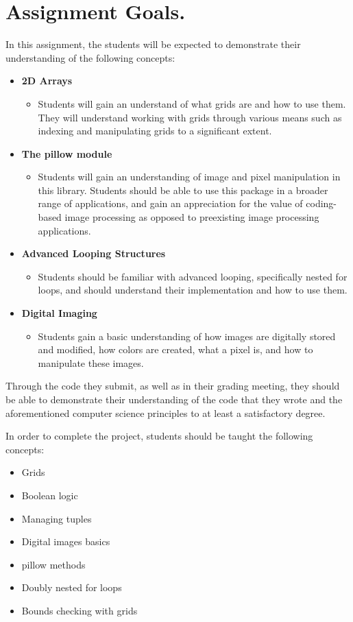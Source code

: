 \documentclass[11pt, letterpaper, onecolumn, oneside, final]{article}
\begin{document}
    \maketitle
\section{Assignment Goals.}
In this assignment, the students will be expected to demonstrate their understanding of the following concepts:
\begin{itemize}
\item \textbf{2D Arrays}
\begin{itemize}
    \item Students will gain an understand of what grids are and how to use them. They will understand working with grids through various means such as indexing and manipulating grids to a significant extent.
\end{itemize}

\item \textbf{The {\consolas pillow} module}
\begin{itemize}
    \item Students will gain an understanding of image and pixel manipulation in this library.
     Students should be able to use this package in a broader range of applications, and gain an appreciation for the value of coding-based image processing as opposed to preexisting image processing applications. 
\end{itemize}
\item \textbf{Advanced Looping Structures} 
\begin{itemize}
    \item Students should be familiar with advanced looping, specifically nested for loops, and should understand their implementation and how to use them.
\end{itemize}
\item \textbf{Digital Imaging}
\begin{itemize}
    \item Students gain a basic understanding of how images are digitally stored and modified, how colors are created, what a pixel is, and how to manipulate these images.
\end{itemize}
\end{itemize}
Through the code they submit, as well as in their grading meeting, they should be able to demonstrate their understanding of the code that they wrote and the aforementioned computer science principles to at least a satisfactory degree.

In order to complete the project, students should be taught the following concepts:
\begin{itemize}
    \item Grids
    \item Boolean logic
    \item Managing tuples
    \item Digital images basics 
    \item {\consolas pillow} methods
    \item Doubly nested for loops
    \item Bounds checking with grids
\end{itemize}
\end{document}
